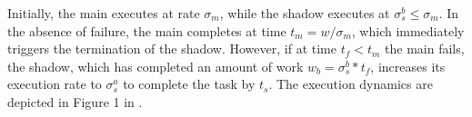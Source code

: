 Initially, the main executes at rate $\sigma_m$, while the shadow executes at $\sigma_s^b \le \sigma_m$. %
In the absence of failure, the main completes at time 
$t_m = w/\sigma_m$, which immediately triggers the termination of the
shadow. However, if at time $t_f < t_m$ the main fails, the shadow, which has completed an amount of work $w_b=\sigma_s^b * t_f$, increases its execution rate to $\sigma_s^a$ to complete the task by $t_s$. %
The execution dynamics are depicted in Figure 1 in \cite{cui_en7085151}. %



